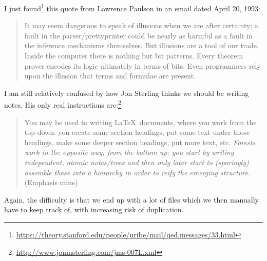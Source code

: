 \begin{node}\label{amn-0008}%
I just found\footnote{\url{https://theory.stanford.edu/people/uribe/mail/qed.messages/33.html}} this quote from Lawrence Paulson
in an email dated April 20, 1993:
\begin{quote}
It may seem dangerous to speak of illusions when we are after certainty; a
fault in the parser/prettyprinter could be nearly as harmful as a fault in the
inference mechanisms themselves.  But illusions are a tool of our trade. 
Inside the computer there is nothing but bit patterns.  Every theorem prover
encodes its logic ultimately in terms of bits.  Even programmers rely upon the
illusion that terms and formulae are present.
\end{quote}
\end{node}

\begin{node}\label{amn-0009}%
I am still relatively confused by how Jon Sterling thinks we should be
writing notes. His only real instructions are:\footnote{\url{http://www.jonmsterling.com/jms-007L.xml}}
\begin{quote}
You may be used to writing \LaTeX\ documents, where you work from the top down: you create some section headings, put some text under those headings, make some deeper section headings, put more text, etc.
\emph{Forests work in the opposite way, from the bottom up: you start by writing independent, atomic notes/trees and then only later start to (sparingly) assemble these into a hierarchy in order to reify the emerging structure.}
(Emphasis mine)
\end{quote}
Again, the difficulty is that we end up with a lot of files which we
then manually have to keep track of, with increasing risk of duplication.
\end{node}